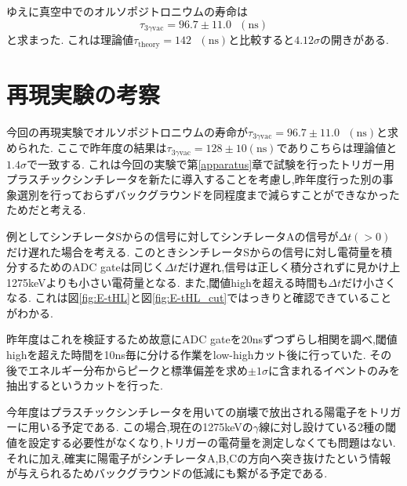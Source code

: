 ゆえに真空中でのオルソポジトロニウムの寿命は
\begin{equation}
	\nonumber
	\tau_{3\gamma\textrm{vac}}=96.7 \pm 11.0\hspace{8pt}(\textrm{ns})
\end{equation}
と求まった.
これは理論値$\tau_\textrm{theory}=142\hspace{8pt}(\textrm{ns})$と比較すると$4.12\sigma$の開きがある.

\section{再現実験の考察}
今回の再現実験でオルソポジトロニウムの寿命が$\tau_{3\gamma\textrm{vac}}=96.7 \pm 11.0\hspace{8pt}(\textrm{ns})$と求められた.
ここで昨年度の結果は$\tau_{3\gamma\textrm{vac}}=128 \pm 10(\textrm{ns})$でありこちらは理論値と$1.4\sigma$で一致する.
これは今回の実験で第\ref{apparatus}章で試験を行ったトリガー用プラスチックシンチレータを新たに導入することを考慮し,昨年度行った別の事象選別を行っておらずバックグラウンドを同程度まで減らすことができなかったためだと考える.\newline

例としてシンチレータSからの信号に対してシンチレータAの信号が$\Delta t(>0)$だけ遅れた場合を考える.
このときシンチレータSからの信号に対し電荷量を積分するためのADC gateは同じく$\Delta t$だけ遅れ,信号は正しく積分されずに見かけ上1275keVよりも小さい電荷量となる.
また,閾値highを超える時間も$\Delta t$だけ小さくなる.%
これは図\ref{fig:E-tHL}と図\ref{fig:E-tHL_cut}ではっきりと確認できていることがわかる.

昨年度はこれを検証するため故意にADC gateを20nsずつずらし相関を調べ,閾値highを超えた時間を10ns毎に分ける作業をlow-highカット後に行っていた.
その後でエネルギー分布からピークと標準偏差を求め$\pm 1\sigma$に含まれるイベントのみを抽出するというカットを行った.

今年度はプラスチックシンチレータを用いての崩壊で放出される陽電子をトリガーに用いる予定である.
この場合,現在の1275keVの$\gamma$線に対し設けている2種の閾値を設定する必要性がなくなり,トリガーの電荷量を測定しなくても問題はない.
それに加え,確実に陽電子がシンチレータA,B,Cの方向へ突き抜けたという情報が与えられるためバックグラウンドの低減にも繋がる予定である.
